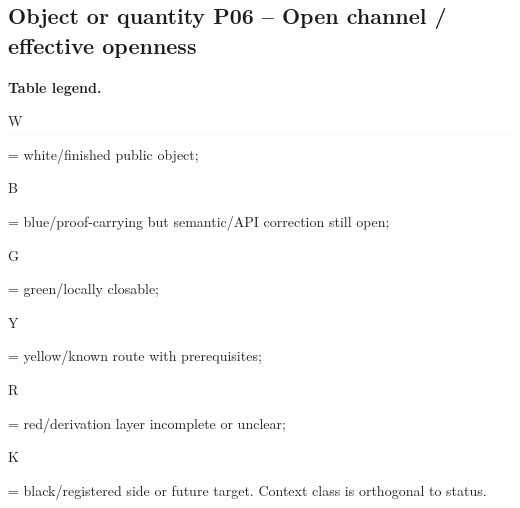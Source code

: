 \subsection*{Object or quantity P06 -- Open channel /\allowbreak{} effective openness}
\hypertarget{objproof:P06}{}
\par\smallskip\noindent\begin{minipage}{0.99\linewidth}\footnotesize\raggedright\textbf{Table legend.} \colorbox{white}{\strut W} = white/finished public object; \colorbox{cyan!20}{\strut B} = blue/proof-carrying but semantic/API correction still open; \colorbox{green!18}{\strut G} = green/locally closable; \colorbox{yellow!25}{\strut Y} = yellow/known route with prerequisites; \colorbox{red!20}{\strut R} = red/derivation layer incomplete or unclear; \colorbox{black!18}{\strut K} = black/registered side or future target. Context class is orthogonal to status.\end{minipage}\par\vspace{0.25em}
